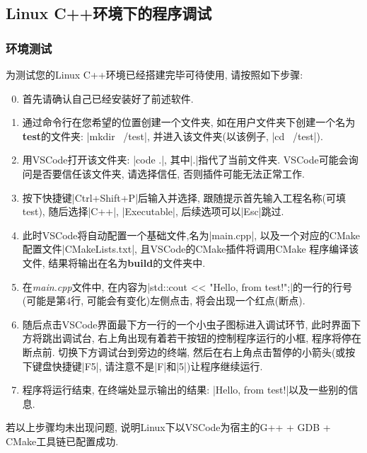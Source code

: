 \subsection{Linux C++环境下的程序调试}
\subsubsection{环境测试}
为测试您的Linux C++环境已经搭建完毕可待使用, 请按照如下步骤:
\begin{enumerate}
      \setcounter{enumi}{-1}
      \item 首先请确认自己已经安装好了前述软件.
      \item 通过命令行在您希望的位置创建一个文件夹, 如在用户文件夹下创建一个名为\textbf{test}的文件夹: \cverb|mkdir ~/test|,
            并进入该文件夹(以该例子, \cverb|cd ~/test|).
      \item 用VSCode打开该文件夹: \cverb|code .|, 其中\cverb|.|指代了当前文件夹. VSCode可能会询问是否要信任该文件夹, 请选择信任, 否则插件可能无法正常工作.
      \item 按下快捷键\cverb|Ctrl+Shift+P|后输入并选择{}, 跟随提示首先输入工程名称(可填test), 随后选择\cverb|C++|,
            \cverb|Executable|, 后续选项可以\cverb|Esc|跳过.
      \item 此时VSCode将自动配置一个基础文件,名为\cverb|main.cpp|, 以及一个对应的CMake配置文件\cverb|CMakeLists.txt|, 且VSCode的CMake插件将调用CMake
            程序编译该文件, 结果将输出在名为\textbf{build}的文件夹中.
      \item 在\emph{main.cpp}文件中, 在内容为\cverb|std::cout << "Hello, from test!\n";|的一行的行号(可能是第4行, 可能会有变化)左侧点击,
            将会出现一个红点(断点).
      \item 随后点击VSCode界面最下方一行的一个小虫子图标进入调试环节, 此时界面下方将跳出调试台,  右上角出现有着若干按钮的控制程序运行的小框, 程序将停在断点前.
            切换下方调试台到旁边的终端, 然后在右上角点击暂停的小箭头(或按下键盘快捷键\cverb|F5|, 请注意不是\cverb|F|和\cverb|5|)让程序继续运行.
      \item 程序将运行结束, 在终端处显示输出的结果: \cverb|Hello, from test!|以及一些别的信息.
\end{enumerate}
若以上步骤均未出现问题, 说明Linux下以VSCode为宿主的G++ + GDB + CMake工具链已配置成功.

